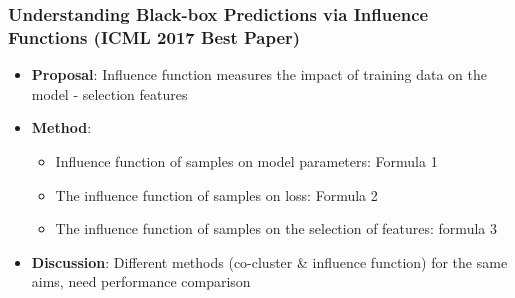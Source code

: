 \documentclass[11pt]{beamer}
\begin{document}
\begin{frame}
    \frametitle{Understanding Black-box Predictions via Influence Functions (ICML 2017 Best Paper)}

    \begin{itemize}
        \item \textbf{Proposal}: Influence function measures the impact of training data on the model - selection features
        \item \textbf{Method}:
              \begin{itemize}
                  \item Influence function of samples on model parameters: Formula 1
                  \item The influence function of samples on loss: Formula 2
                  \item The influence function of samples on the selection of features: formula 3
              \end{itemize}
        \item \textbf{Discussion}: Different methods (co-cluster \& influence function) for the same aims, need performance comparison
    \end{itemize}


\end{frame}
\end{document}
